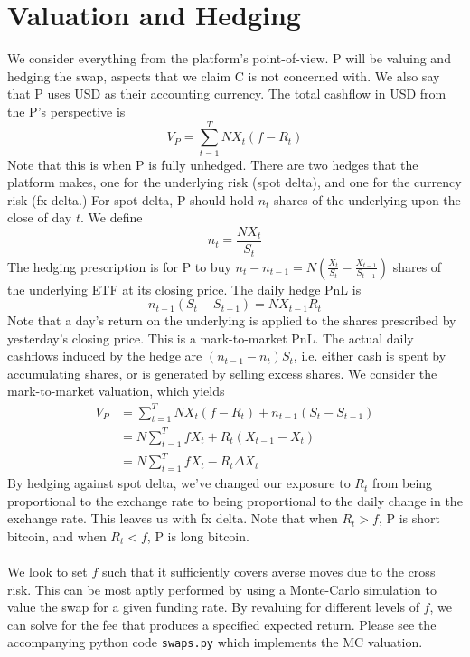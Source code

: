\documentclass[11pt]{report}
\begin{document}
\section*{Valuation and Hedging}
    We consider everything from the platform's point-of-view. P will be valuing
    and hedging the swap, aspects that we claim C is not concerned with. We also say
    that P uses USD as their accounting currency. The total cashflow in USD from
    the P's perspective is
    \[
    V_P = \sum_{t=1}^T NX_t(f - R_t) 
    \]
    Note that this is when P is fully unhedged. There are two hedges that the platform
    makes, one for the underlying risk (spot delta), and one for the currency risk (fx delta.) 
    For spot delta, P should hold $n_t$ shares of the underlying upon the close of day $t$. 
    We define
    \[
    n_t = \frac{NX_t}{S_t}
    \]
    The hedging prescription is for P to buy 
    $n_t - n_{t-1} = N\left(\frac{X_t}{S_t}-\frac{X_{t-1}}{S_{t-1}}\right)$ shares of the underlying
    ETF at its closing price. The daily hedge PnL is
    \[
    n_{t-1}(S_t - S_{t-1}) = NX_{t-1}R_t
    \]
    Note that a day's return on the underlying is applied to the shares prescribed by yesterday's closing
    price. This is a mark-to-market PnL. The actual daily cashflows induced by the hedge are
    $(n_{t-1}-n_t)S_t$, i.e. either cash is spent by accumulating shares, or is generated by selling excess
    shares. We consider the mark-to-market valuation, which yields
    \begin{align*}
    V_P &= \sum_{t=1}^T NX_t(f - R_t) + n_{t-1}(S_t - S_{t-1}) \\
    &= N\sum_{t=1}^T fX_t + R_t(X_{t-1} - X_t) \\
    &= N\sum_{t=1}^T fX_t - R_t\Delta X_t
    \end{align*}
    By hedging against spot delta, we've changed our exposure to $R_t$ from being proportional
    to the exchange rate to being proportional to the daily change in the exchange rate. This leaves
    us with fx delta. Note that when $R_t > f$, P is short bitcoin, and when $R_t < f$, P is long bitcoin.
    \\\\
    We look to set $f$ such that it sufficiently covers averse moves due to the cross risk. This can be most
    aptly performed by using a Monte-Carlo simulation to value the swap for a given funding rate. By revaluing
    for different levels of $f$, we can solve for the fee that produces a specified expected return. Please
    see the accompanying python code \texttt{swaps.py} which implements the MC valuation. 
    
\end{document}
